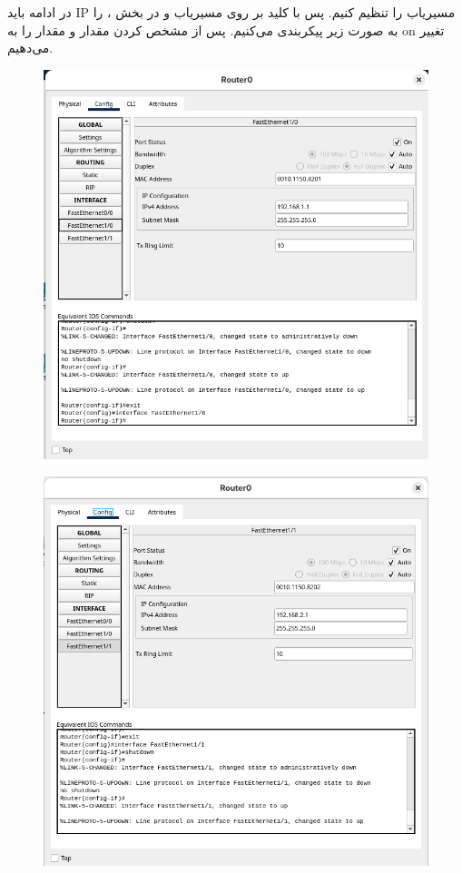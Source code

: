 \clearpage
در ادامه باید IP مسیریاب را تنظیم کنیم. پس با کلید بر روی مسیریاب و در بخش ،  را به صورت زیر پیکربندی می‌کنیم. پس از مشخص کردن مقدار  و  مقدار  را به on تغییر می‌دهیم.
\begin{figure}[h]
    \centering
    \includegraphics[width=1\textwidth]{img/3.png}
\end{figure}
\begin{figure}[h]
    \centering
    \includegraphics[width=1\textwidth]{img/4.png}
\end{figure}
